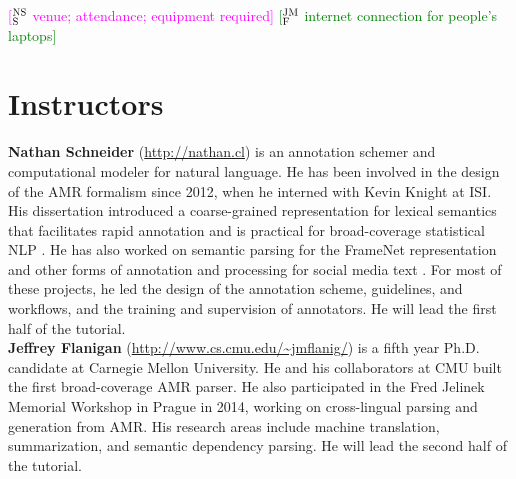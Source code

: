 \documentclass[12pt,a4paper]{article}
\newcommand{\ensuretext}[1]{#1}
\newcommand{\jmfmarker}{\ensuretext{\textcolor{green}{\ensuremath{^{\textsc{JM}}_{\textsc{F}}}}}}
\newcommand{\nssmarker}{\ensuretext{\textcolor{magenta}{\ensuremath{^{\textsc{NS}}_{\textsc{S}}}}}}
\newcommand{\arkcomment}[3]{\ensuretext{\textcolor{#3}{[#1 #2]}}}
\newcommand{\jmf}[1]{\arkcomment{\jmfmarker}{#1}{green}}
\newcommand{\nss}[1]{\arkcomment{\nssmarker}{#1}{magenta}}
\begin{document}
\nss{venue; attendance; equipment required}
\jmf{internet connection for people's laptops}

\section{Instructors}

\textbf{Nathan Schneider} (\url{http://nathan.cl}) is an annotation schemer and computational modeler for natural language. 
He has been involved in the design of the AMR formalism since 2012, 
when he interned with Kevin Knight at ISI. 
His dissertation introduced a coarse-grained representation for lexical semantics that facilitates rapid annotation 
and is practical for broad-coverage statistical NLP \citep{schneider-thesis}. 
He has also worked on semantic parsing for the FrameNet representation \citep{das-14} 
and other forms of annotation and processing for social media text \citep{gimpel-11,owoputi-13,schneider-13,kong-14,mohit-12}.
For most of these projects, he led the design of the annotation scheme, guidelines, and workflows, 
and the training and supervision of annotators.
He will lead the first half of the tutorial.\\[-5pt]

\noindent \textbf{Jeffrey Flanigan} (\url{http://www.cs.cmu.edu/~jmflanig/}) is a fifth year Ph.D. candidate at Carnegie Mellon University.
He and his collaborators at CMU built the first broad-coverage AMR parser\citep{flanigan-14}.
He also participated in the Fred Jelinek Memorial Workshop in Prague in 2014, working on cross-lingual parsing and generation from AMR.
His research areas include machine translation, summarization, and semantic dependency parsing.
He will lead the second half of the tutorial.


\setlength{\bibsep}{1pt}
{\fontsize{10}{12.25}\selectfont
}
\end{document}
